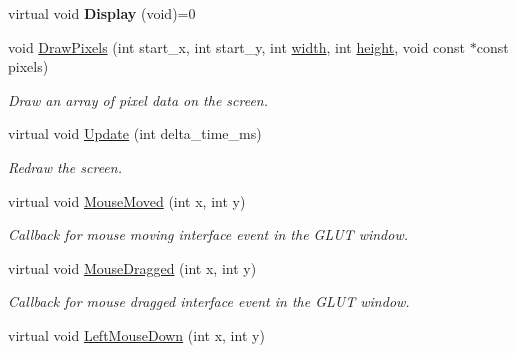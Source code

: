 \begin{DoxyCompactItemize}
\item 
virtual void {\bfseries Display} (void)=0\hypertarget{classimage__tools_1_1BaseGfxApp_aba7ae5ed9a1d794d8c6c4be1d5fa4722}{}\label{classimage__tools_1_1BaseGfxApp_aba7ae5ed9a1d794d8c6c4be1d5fa4722}

\item 
void \hyperlink{classimage__tools_1_1BaseGfxApp_afec9de9223c9fc7acb2d01ec7d5283a2}{Draw\+Pixels} (int start\+\_\+x, int start\+\_\+y, int \hyperlink{classimage__tools_1_1BaseGfxApp_a2fe403c5392f624477c2ce4429f1a7b5}{width}, int \hyperlink{classimage__tools_1_1BaseGfxApp_aa961e13a7a8e6062204223cc33ac7503}{height}, void const $\ast$const pixels)\hypertarget{classimage__tools_1_1BaseGfxApp_afec9de9223c9fc7acb2d01ec7d5283a2}{}\label{classimage__tools_1_1BaseGfxApp_afec9de9223c9fc7acb2d01ec7d5283a2}

\begin{DoxyCompactList}\small\item\em Draw an array of pixel data on the screen. \end{DoxyCompactList}\item 
virtual void \hyperlink{classimage__tools_1_1BaseGfxApp_ad07efe6b7a1f140ccdb9a41d12fc1913}{Update} (int delta\+\_\+time\+\_\+ms)
\begin{DoxyCompactList}\small\item\em Redraw the screen. \end{DoxyCompactList}\item 
virtual void \hyperlink{classimage__tools_1_1BaseGfxApp_ab2aa4111469862051287ba2b9983224d}{Mouse\+Moved} (int x, int y)
\begin{DoxyCompactList}\small\item\em Callback for mouse moving interface event in the G\+L\+UT window. \end{DoxyCompactList}\item 
virtual void \hyperlink{classimage__tools_1_1BaseGfxApp_ac4fa9008fc0d0748c45e5bbe610efa45}{Mouse\+Dragged} (int x, int y)\hypertarget{classimage__tools_1_1BaseGfxApp_ac4fa9008fc0d0748c45e5bbe610efa45}{}\label{classimage__tools_1_1BaseGfxApp_ac4fa9008fc0d0748c45e5bbe610efa45}

\begin{DoxyCompactList}\small\item\em Callback for mouse dragged interface event in the G\+L\+UT window. \end{DoxyCompactList}\item 
virtual void \hyperlink{classimage__tools_1_1BaseGfxApp_a329831f9843ed220fb8ec757f1e72b84}{Left\+Mouse\+Down} (int x, int y)\hypertarget{classimage__tools_1_1BaseGfxApp_a329831f9843ed220fb8ec757f1e72b84}{}\label{classimage__tools_1_1BaseGfxApp_a329831f9843ed220fb8ec757f1e72b84}


\end{DoxyCompactItemize}
